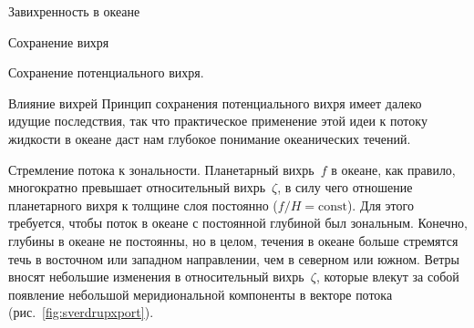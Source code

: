 \begin{chapter}{Завихренность в океане}
\begin{section}{Сохранение вихря}
\begin{paragraph}{Сохранение потенциального вихря.}
%
\end{paragraph}
\end{section}

\begin{section}{Влияние вихрей}
%
Принцип сохранения потенциального вихря имеет далеко идущие последствия, 
так что практическое применение этой идеи к потоку жидкости в океане 
даст нам глубокое понимание океанических течений.
%

\begin{paragraph}{Стремление потока к зональности.} 
Планетарный вихрь~$f$ в океане, как правило, многократно превышает 
относительный вихрь~$\zeta$, в силу чего отношение планетарного вихря
к толщине слоя постоянно ($f/H=\text{const}$). Для этого требуется, 
чтобы поток в океане с постоянной глубиной был зональным. 
Конечно, глубины в океане не постоянны, но в целом, течения в океане больше 
стремятся течь в восточном или западном направлении, чем в северном или южном. 
Ветры вносят небольшие изменения в относительный вихрь~$\zeta$, которые влекут
за собой появление небольшой меридиональной компоненты в векторе потока 
(рис.~\ref{fig:sverdrupxport}).
%
\end{paragraph}


\end{section}
\end{chapter}
